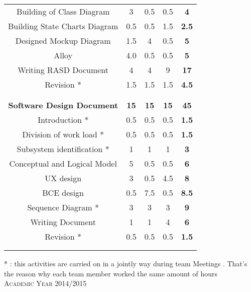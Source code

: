 \documentclass[a4paper]{article}
\begin{document}
\begin{table}[ht]
\begin{tabular}{c c c c c}
		Building of Class Diagram  & 3 & 0.5 & 0.5 &\textbf{4}\\
		Building State Charts Diagram & 0.5 & 0.5 & 1.5&\textbf{2.5}\\
		Designed Mockup Diagram & 1.5 & 4 & 0.5 &\textbf{5}\\
		Alloy  & 4.0 & 0.5 & 0.5 & \textbf{5}\\  %
		Writing RASD Document  & 4 & 4 & 9 & \textbf{17}\\
		Revision * & 1.5 & 1.5 & 1.5 & \textbf{4.5}\\ [1ex]
		\tabularnewline
		\hline %
		\tabularnewline
		\textbf{Software Design Document } & \textbf{15} & \textbf{15} & \textbf{15} &  \textbf{45}\\ %
		Introduction *   & 0.5 & 0.5 & 0.5 & \textbf{1.5}\\
		Division of work load *   & 0.5 & 0.5 & 0.5 & \textbf{1.5} \\
		Subsystem identification *   & 1 & 1 & 1 & \textbf{3}\\
		Conceptual and Logical Model & 5 & 0.5 & 0.5 &\textbf{6}\\
		UX design & 3 & 0.5 & 4.5 & \textbf{8}\\
		BCE design & 0.5 & 7.5 & 0.5 & \textbf{8.5}\\
		Sequence Diagram * & 3 & 3 & 3 & \textbf{9}\\
		Writing Document & 1 & 1 & 4 & \textbf{6}\\
		Revision * & 0.5 & 0.5 & 0.5 & \textbf{1.5}\\
		\tabularnewline
		\hline 
		\hline %
		\tabularnewline
		\end{tabular}
	\end{table}
		
		
	\begin{center}
	 * : this activities are carried on in a jointly way during team Meetings . That's the reason why each team member worked the same amount of hours\\
		\vspace{3.5cm}
		\textsc{Academic Year 2014/2015}
	\end{center}
\end{document}
